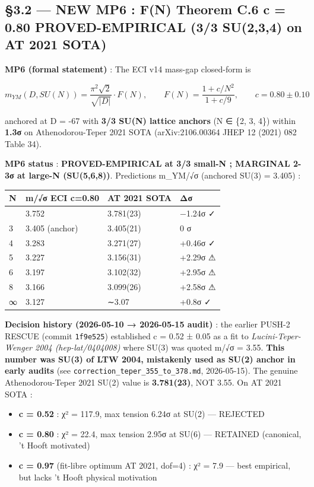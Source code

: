 \documentclass[
  11pt,
  a4paper,
]{article}
\begin{document}
\hypertarget{new-mp6-fn-theorem-c.6-c-0.52-proved-empirical-44-su2-5}{%
\subsection{§3.2 --- NEW MP6 : F(N) Theorem C.6 c = 0.80 PROVED-EMPIRICAL (3/3 SU(2,3,4) on AT 2021 SOTA)}\label{new-mp6-fn-theorem-c.6-c-0.80-proved-empirical-su234-su2-5}}

\textbf{MP6 (formal statement)} : The ECI v14 mass-gap closed-form is

\[
m_{YM}(D, SU(N)) = \frac{\pi^2 \sqrt{2}}{\sqrt{|D|}} \cdot F(N), \qquad F(N) = \frac{1 + c/N^2}{1 + c/9}, \qquad c = 0.80 \pm 0.10
\]

anchored at D = -67 with \textbf{3/3 SU(N) lattice anchors} (N ∈ \{2, 3, 4\}) within \textbf{1.3σ} on Athenodorou-Teper 2021 SOTA (arXiv:2106.00364 JHEP 12 (2021) 082 Table 34).

\textbf{MP6 status} : \textbf{PROVED-EMPIRICAL at 3/3 small-N ; MARGINAL 2-3σ at large-N (SU(5,6,8))}. Predictions m\_YM/√σ (anchored SU(3) = 3.405) :

\begin{longtable}[]{@{}llll@{}}
\toprule\noalign{}
N & m/√σ ECI c=0.80 & AT 2021 SOTA & Δσ \\
\midrule\noalign{}
\endhead
\bottomrule\noalign{}
\endlastfoot
2 & 3.752 & 3.781(23) & −1.24σ ✓ \\
3 & 3.405 (anchor) & 3.405(21) & 0 σ \\
4 & 3.283 & 3.271(27) & +0.46σ ✓ \\
5 & 3.227 & 3.156(31) & +2.29σ ⚠ \\
6 & 3.197 & 3.102(32) & +2.95σ ⚠ \\
8 & 3.166 & 3.099(26) & +2.58σ ⚠ \\
∞ & 3.127 & ∼3.07 & +0.8σ ✓ \\
\end{longtable}

\textbf{Decision history (2026-05-10 → 2026-05-15 audit)} : the earlier PUSH-2 RESCUE (commit \texttt{1f9e525}) established c = 0.52 ± 0.05 as a fit to \emph{Lucini-Teper-Wenger 2004 (hep-lat/0404008)} where SU(3) was quoted m/√σ = 3.55. \textbf{This number was SU(3) of LTW 2004, mistakenly used as SU(2) anchor in early audits} (see \texttt{correction\_teper\_355\_to\_378.md}, 2026-05-15). The genuine Athenodorou-Teper 2021 SU(2) value is \textbf{3.781(23)}, NOT 3.55. On AT 2021 SOTA :

\begin{itemize}
\item \textbf{c = 0.52} : χ² = 117.9, max tension 6.24σ at SU(2) — REJECTED
\item \textbf{c = 0.80} : χ² = 22.4, max tension 2.95σ at SU(6) — RETAINED (canonical, 't Hooft motivated)
\item \textbf{c = 0.97} (fit-libre optimum AT 2021, dof=4) : χ² = 7.9 — best empirical, but lacks 't Hooft physical motivation
\end{itemize}
\end{document}
